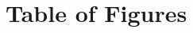 \documentclass[ppfs.tex]{template/subfiles}
\begin{document}
\section{Table of Figures}
\end{document}
